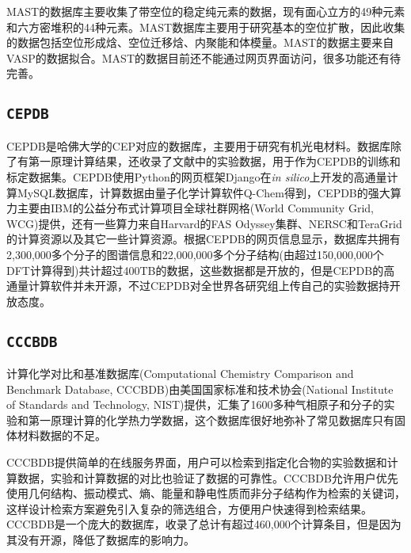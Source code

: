 \textrm{MAST}的数据库主要收集了带空位的稳定纯元素的数据，现有面心立方的49种元素和六方密堆积的44种元素。\textrm{MAST}数据库主要用于研究基本的空位扩散，因此收集的数据包括空位形成焓、空位迁移焓、内聚能和体模量\cite{NJP16-015108_2014}。\textrm{MAST}的数据主要来自\textrm{VASP}的数据拟合。\textrm{MAST}的数据目前还不能通过网页界面访问，很多功能还有待完善。

\subsection{\tt{CEPDB}}
\textrm{CEPDB}是哈佛大学的\textrm{CEP}对应的数据库，主要用于研究有机光电材料\cite{CEPDB_URL,JPCL2-2241_2011}。数据库除了有第一原理计算结果，还收录了文献中的实验数据，用于作为\textrm{CEPDB}的训练和标定数据集。\textrm{CEPDB}使用\textrm{Python}的网页框架\textrm{Django}在\textit{in silico}上开发的高通量计算\textrm{MySQL}数据库，计算数据由量子化学计算软件\textrm{Q-Chem}得到，\textrm{CEPDB}的强大算力主要由\textrm{IBM}的公益分布式计算项目全球社群网格\textrm{(World Community Grid, WCG)}提供，还有一些算力来自\textrm{Harvard}的\textrm{FAS Odyssey}集群、\textrm{NERSC}和\textrm{TeraGrid}的计算资源以及其它一些计算资源。根据\textrm{CEPDB}的网页信息显示，数据库共拥有2,300,000多个分子的图谱信息和22,000,000多个分子结构(由超过150,000,000个\textrm{DFT}计算得到)共计超过400\textrm{TB}的数据，这些数据都是开放的，但是\textrm{CEPDB}的高通量计算软件并未开源，不过\textrm{CEPDB}对全世界各研究组上传自己的实验数据持开放态度。

\subsection{\texttt{CCCBDB}}
计算化学对比和基准数据库\textrm{(Computational Chemistry Comparison and Benchmark Database, CCCBDB)}由美国国家标准和技术协会(\textrm{National Institute of Standards and Technology, NIST})提供，汇集了1600多种气相原子和分子的实验和第一原理计算的化学热力学数据\cite{CCCBDB}，这个数据库很好地弥补了常见数据库只有固体材料数据的不足。

\textrm{CCCBDB}提供简单的在线服务界面，用户可以检索到指定化合物的实验数据和计算数据，实验和计算数据的对比也验证了数据的可靠性。\textrm{CCCBDB}允许用户优先使用几何结构、振动模式、熵、能量和静电性质而非分子结构作为检索的关键词，这样设计检索方案避免引入复杂的筛选组合，方便用户快速得到检索结果。\textrm{CCCBDB}是一个庞大的数据库，收录了总计有超过460,000个计算条目，但是因为其没有开源，降低了数据库的影响力。


